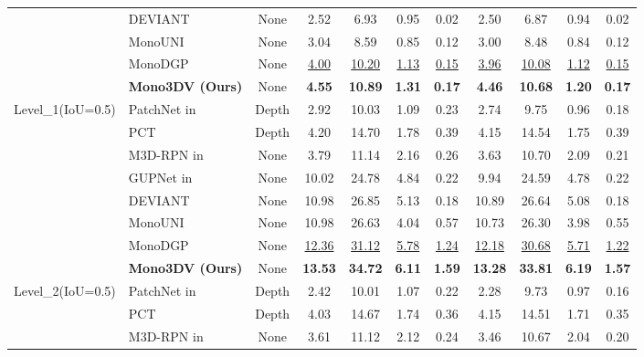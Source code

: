 \begin{table}[!ht]
{\begin{tabular}{c|l|c|cccc|cccc}
 & DEVIANT \cite{DEVIANT} & None & 2.52 & 6.93 & 0.95 & 0.02 & 2.50 & 6.87 & 0.94 & 0.02 \\
 & MonoUNI \cite{MonoUNI} & None & 3.04 & 8.59 & 0.85 & 0.12 & 3.00 & 8.48 & 0.84 & 0.12 \\
 & MonoDGP \cite{MonoDGP} & None & \underline{4.00} & \underline{10.20} & \underline{1.13} & \underline{0.15} & \underline{3.96} & \underline{10.08} & \underline{1.12} & \underline{0.15} \\ 
 & \textbf{Mono3DV (Ours)} & None & \textbf{4.55} & \textbf{10.89} & \textbf{1.31} & \textbf{0.17} & \textbf{4.46} & \textbf{10.68} & \textbf{1.20} & \textbf{0.17} \\
\hline
\multirow{8}{*}{{Level\_1\newline (IoU=0.5)}} 
 & PatchNet \cite{patchnet} in \cite{pct} & Depth & 2.92 & 10.03 & 1.09 & 0.23 & 2.74 & 9.75 & 0.96 & 0.18 \\
 & PCT \cite{pct} & Depth & 4.20 & 14.70 & 1.78 & 0.39 & 4.15 & 14.54 & 1.75 & 0.39 \\
 & M3D-RPN \cite{m3d-rpn} in \cite{CaDDN} & None & 3.79 & 11.14 & 2.16 & 0.26 & 3.63 & 10.70 & 2.09 & 0.21 \\
 & GUPNet \cite{GUPNet} in \cite{DEVIANT} & None & 10.02 & 24.78 & 4.84 & 0.22 & 9.94 & 24.59 & 4.78 & 0.22 \\
 & DEVIANT \cite{DEVIANT} & None & 10.98 & 26.85 & 5.13 & 0.18 & 10.89 & 26.64 & 5.08 & 0.18 \\
 & MonoUNI \cite{MonoUNI} & None & 10.98 & 26.63 & 4.04 & 0.57 & 10.73 & 26.30 & 3.98 & 0.55 \\
 & MonoDGP \cite{MonoDGP} & None & \underline{12.36} & \underline{31.12} & \underline{5.78} & \underline{1.24} & \underline{12.18} & \underline{30.68} & \underline{5.71} & \underline{1.22} \\ 
 & \textbf{Mono3DV (Ours)} & None & \textbf{13.53} & \textbf{34.72} & \textbf{6.11} & \textbf{1.59} & \textbf{13.28} & \textbf{33.81} & \textbf{6.19} & \textbf{1.57} \\
\hline
\multirow{8}{*}{{Level\_2\newline (IoU=0.5)}} 
 & PatchNet \cite{patchnet} in \cite{pct} & Depth & 2.42 & 10.01 & 1.07 & 0.22 & 2.28 & 9.73 & 0.97 & 0.16 \\
 & PCT \cite{pct} & Depth & 4.03 & 14.67 & 1.74 & 0.36 & 4.15 & 14.51 & 1.71 & 0.35 \\
 & M3D-RPN \cite{m3d-rpn} in \cite{CaDDN} & None & 3.61 & 11.12 & 2.12 & 0.24 & 3.46 & 10.67 & 2.04 & 0.20 \\

\end{tabular}}
\end{table}
